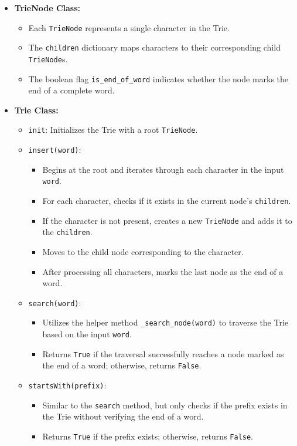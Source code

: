 \begin{itemize}
    \item \textbf{TrieNode Class:}
    \begin{itemize}
        \item Each \texttt{TrieNode} represents a single character in the Trie.
        \item The \texttt{children} dictionary maps characters to their corresponding child \texttt{TrieNode}s.
        \item The boolean flag \texttt{is\_end\_of\_word} indicates whether the node marks the end of a complete word.
    \end{itemize}
    
    \item \textbf{Trie Class:}
    \begin{itemize}
        \item \texttt{init}: Initializes the Trie with a root \texttt{TrieNode}.
        
        \item \texttt{insert(word)}:
        \begin{itemize}
            \item Begins at the root and iterates through each character in the input \texttt{word}.
            \item For each character, checks if it exists in the current node's \texttt{children}.
            \item If the character is not present, creates a new \texttt{TrieNode} and adds it to the \texttt{children}.
            \item Moves to the child node corresponding to the character.
            \item After processing all characters, marks the last node as the end of a word.
        \end{itemize}
        
        \item \texttt{search(word)}:
        \begin{itemize}
            \item Utilizes the helper method \texttt{\_search\_node(word)} to traverse the Trie based on the input \texttt{word}.
            \item Returns \texttt{True} if the traversal successfully reaches a node marked as the end of a word; otherwise, returns \texttt{False}.
        \end{itemize}
        
        \item \texttt{startsWith(prefix)}:
        \begin{itemize}
            \item Similar to the \texttt{search} method, but only checks if the prefix exists in the Trie without verifying the end of a word.
            \item Returns \texttt{True} if the prefix exists; otherwise, returns \texttt{False}.
        \end{itemize}
        

\end{itemize}
\end{itemize}
